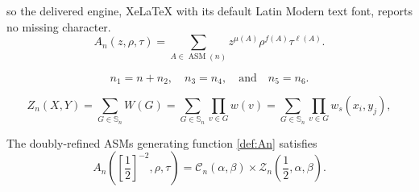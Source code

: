 \documentclass[10pt,a4paper]{amsart}
\DeclareMathOperator{\ASM}{ASM}
\begin{document}
so the delivered engine, XeLaTeX with its default Latin Modern text font, reports no missing character.
\begin{equation}\label{def:An}
A_n(z,\rho,\tau) = \sum_{A\in \ASM(n)} z^{\mu(A)} \rho^{f(A)} \tau^{\ell(A)}.
\end{equation}

\begin{equation}\label{ni}
n_1 = n + n_2, \quad n_3 = n_4, \quad \text{and} \quad n_5 = n_6.
\end{equation}

\begin{equation}\label{def:Zn}
Z_n(X,Y)=\sum_{G \in \mathbb{S}_n} W(G)=\sum_{G \in \mathbb{S}_n} \prod_{v \in G}w(v)
=\sum_{G \in \mathbb{S}_n} \prod_{v \in G}w_s(x_i,y_j),
\end{equation}

\begin{theorem}\label{th:A=CZ} 
	The doubly-refined ASMs generating function \eqref{def:An} satisfies
    \begin{equation}\label{athq}
			A_n([\frac12]^{-2},\rho,\tau)=\mathcal{C}_n(\alpha, \beta) \times \mathcal{Z}_n(\frac{1}{2},\alpha,\beta).
    \end{equation}
\end{theorem}
\end{document}
